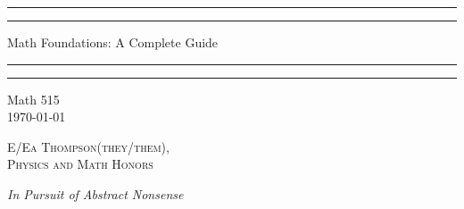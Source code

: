\documentclass[12pt, a4paper, oneside, openright, titlepage]{book}
\begin{document}

\begin{titlepage}
    \centering
    \scshape
    \vspace*{\baselineskip}
    \rule{\textwidth}{1.6pt}\vspace*{-\baselineskip}\vspace*{2pt}
    \rule{\textwidth}{0.4pt}
    
    \vspace{0.75\baselineskip}
    
    {\LARGE Math Foundations: A Complete Guide}
    
    \vspace{0.75\baselineskip}
    
    \rule{\textwidth}{0.4pt}\vspace*{-\baselineskip}\vspace{3.2pt}
    \rule{\textwidth}{1.6pt}
    
    \vspace{2\baselineskip}
    Math 515 \\
    \vspace*{3\baselineskip}
    \monthdayyeardate\today \\
    \vspace*{5.0\baselineskip}
    
    {\scshape\Large E/Ea Thompson(they/them), \\ Physics and Math Honors\\}
    
    \vspace{1.0\baselineskip}
    \textit{In Pursuit of Abstract Nonsense}
    \vfill
    \enlargethispage{1in}
    \begin{figure}[b!]
    \end{figure}
\end{titlepage}
\end{document}

